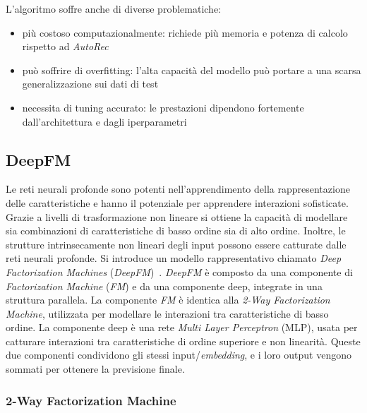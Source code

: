 L'algoritmo soffre anche di diverse problematiche:

\begin{itemize}
  \item più costoso computazionalmente: richiede più memoria e potenza di calcolo rispetto ad \textit{AutoRec}
  \item può soffrire di overfitting: l'alta capacità del modello può portare a una scarsa generalizzazione sui dati di test
  \item necessita di tuning accurato: le prestazioni dipendono fortemente dall'architettura e dagli iperparametri
\end{itemize}

\subsection{DeepFM}
Le reti neurali profonde sono potenti nell’apprendimento della rappresentazione delle caratteristiche e hanno il potenziale per apprendere interazioni sofisticate. Grazie a livelli di trasformazione non lineare si ottiene la capacità di modellare sia combinazioni di caratteristiche di basso ordine sia di alto ordine. Inoltre, le strutture intrinsecamente non lineari degli input possono essere catturate dalle reti neurali profonde. Si introduce un modello rappresentativo chiamato \textit{Deep Factorization Machines} (\textit{DeepFM})~\cite{DeepFM}. \textit{DeepFM} è composto da una componente di \textit{Factorization Machine} (\textit{FM}) e da una componente deep, integrate in una struttura parallela. La componente \textit{FM} è identica alla \textit{2-Way Factorization Machine}, utilizzata per modellare le interazioni tra caratteristiche di basso ordine. La componente deep è una rete \textit{Multi Layer Perceptron} (MLP), usata per catturare interazioni tra caratteristiche di ordine superiore e non linearità. Queste due componenti condividono gli stessi input/\textit{embedding}, e i loro output vengono sommati per ottenere la previsione finale.

\subsubsection{2-Way Factorization Machine}

